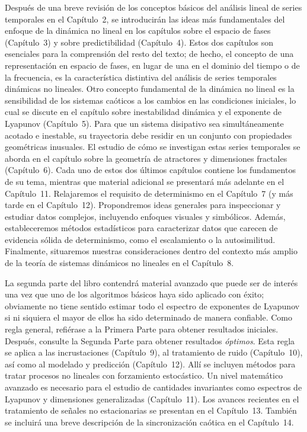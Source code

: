 \documentclass[10pt,a4paper]{book}
\begin{document}
Después de una breve revisión de los conceptos básicos del análisis lineal de series temporales en el Capítulo~2, se introducirán las ideas más fundamentales del enfoque de la dinámica no lineal en los capítulos sobre el espacio de fases (Capítulo~3) y sobre predictibilidad (Capítulo~4). Estos dos capítulos son esenciales para la comprensión del resto del texto; de hecho, el concepto de una representación en espacio de fases, en lugar de una en el dominio del tiempo o de la frecuencia, es la característica distintiva del análisis de series temporales dinámicas no lineales. Otro concepto fundamental de la dinámica no lineal es la sensibilidad de los sistemas caóticos a los cambios en las condiciones iniciales, lo cual se discute en el capítulo sobre inestabilidad dinámica y el exponente de Lyapunov (Capítulo~5). Para que un sistema disipativo sea simultáneamente acotado e inestable, su trayectoria debe residir en un conjunto con propiedades geométricas inusuales. El estudio de cómo se investigan estas series temporales se aborda en el capítulo sobre la geometría de atractores y dimensiones fractales (Capítulo~6). Cada uno de estos dos últimos capítulos contiene los fundamentos de su tema, mientras que material adicional se presentará más adelante en el Capítulo~11. Relajaremos el requisito de determinismo en el Capítulo~7 (y más tarde en el Capítulo~12). Propondremos ideas generales para inspeccionar y estudiar datos complejos, incluyendo enfoques visuales y simbólicos. Además, estableceremos métodos estadísticos para caracterizar datos que carecen de evidencia sólida de determinismo, como el escalamiento o la autosimilitud. Finalmente, situaremos nuestras consideraciones dentro del contexto más amplio de la teoría de sistemas dinámicos no lineales en el Capítulo~8.

\bigskip

La segunda parte del libro contendrá material avanzado que puede ser de interés una vez que uno de los algoritmos básicos haya sido aplicado con éxito; obviamente no tiene sentido estimar todo el espectro de exponentes de Lyapunov si ni siquiera el mayor de ellos ha sido determinado de manera confiable. Como regla general, refiérase a la Primera Parte para obtener resultados iniciales. Después, consulte la Segunda Parte para obtener resultados \emph{óptimos}. Esta regla se aplica a las incrustaciones (Capítulo~9), al tratamiento de ruido (Capítulo~10), así como al modelado y predicción (Capítulo~12). Allí se incluyen métodos para tratar procesos no lineales con forzamiento estocástico. Un nivel matemático avanzado es necesario para el estudio de cantidades invariantes como espectros de Lyapunov y dimensiones generalizadas (Capítulo~11). Los avances recientes en el tratamiento de señales no estacionarias se presentan en el Capítulo~13. También se incluirá una breve descripción de la sincronización caótica en el Capítulo~14.
\end{document}
